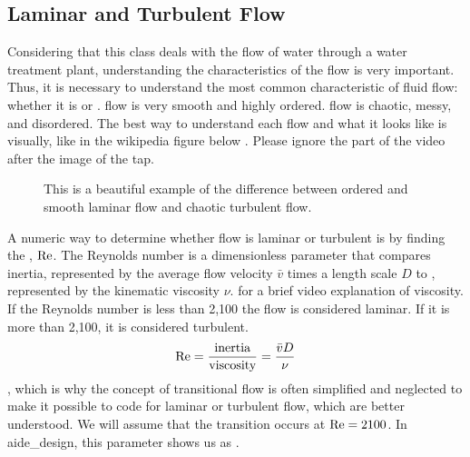 \documentclass[letterpaper,10pt,english]{sphinxmanual}
\let\sphinxpxdimen\pdfpxdimen\else\newdimen\sphinxpxdimen
\begin{document}
\subsection{Laminar and Turbulent Flow}
\label{\detokenize{Fluids_Review/Fluids_Review_Design:laminar-and-turbulent-flow}}\label{\detokenize{Fluids_Review/Fluids_Review_Design:id4}}
Considering that this class deals with the flow of water through a water treatment plant, understanding the characteristics of the flow is very important. Thus, it is necessary to understand the most common characteristic of fluid flow: whether it is  or      .  flow is very smooth and highly ordered.  flow is chaotic, messy, and disordered. The best way to understand each flow and what it looks like is visually, like in the wikipedia figure below . Please ignore the part of the video after the image of the tap.

\begin{figure}[htbp]
\centering
\capstart

\noindent\sphinxincludegraphics[width=400\sphinxpxdimen]{{Wikipedia_laminar_turbulent}.png}
\caption{This is a beautiful example of the difference between ordered and smooth laminar flow and chaotic turbulent flow.}\label{\detokenize{Fluids_Review/Fluids_Review_Design:id12}}\label{\detokenize{Fluids_Review/Fluids_Review_Design:wikipedia-laminar-turbulent}}\end{figure}

A numeric way to determine whether flow is laminar or turbulent is by finding the , \({\rm Re}\). The Reynolds number is a dimensionless parameter that compares inertia, represented by the average flow velocity \(\bar v\) times a length scale \(D\) to , represented by the kinematic viscosity \(\nu\).  for a brief video explanation of viscosity. If the Reynolds number is less than 2,100 the flow is considered laminar. If it is more than 2,100, it is considered turbulent.
\begin{equation}\label{equation:Fluids_Review/Fluids_Review_Design:Fluids_Review/Fluids_Review_Design:4}
\begin{split}{\rm Re = \frac{inertia}{viscosity}} = \frac{\bar vD}{\nu}\end{split}
\end{equation}
, which is why the concept of transitional flow is often simplified and neglected to make it possible to code for laminar or turbulent flow, which are better understood. We will assume that the transition occurs at \(\rm{Re} = 2100\). In aide\_design, this parameter shows us as .
\end{document}
